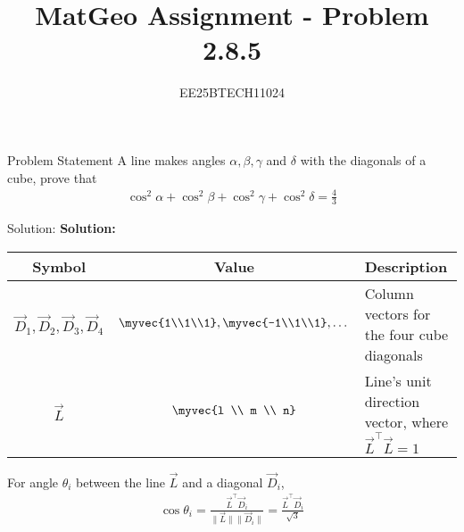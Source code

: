 \documentclass{beamer}
\title{MatGeo Assignment - Problem 2.8.5}
\author{EE25BTECH11024}
\institute{IIT Hyderabad}
\begin{document}
\begin{frame}
  \titlepage
\end{frame}

\begin{frame}{Problem Statement}
A line makes angles $\alpha, \beta, \gamma$ and $\delta$ with the diagonals of a cube, prove that
\begin{align}
\cos^2\alpha + \cos^2\beta + \cos^2\gamma + \cos^2\delta = \frac{4}{3}
\end{align}
\end{frame}

\begin{frame}{Solution: }
\noindent
\textbf{Solution:}\\

\begin{center}
    \begin{tabular}{|c|c|p{5cm}|}
    \hline
    \textbf{Symbol} & \textbf{Value} & \textbf{Description}  \\
    \hline
    \textbf{$\vec{D}_1, \vec{D}_2, \vec{D}_3, \vec{D}_4$} & $\myvec{1\\1\\1}, \myvec{-1\\1\\1}, \dots$ & Column vectors for the four cube diagonals \\
    \hline
    \textbf{$\vec{L}$} & $\myvec{l \\ m \\ n}$ & Line's unit direction vector, where $\vec{L}^\top\vec{L} = 1$ \\
    \hline
    \end{tabular}
\end{center}
\noindent

\noindent
For angle $\theta_i$ between the line $\vec{L}$ and a diagonal $\vec{D}_i$,
\begin{align}
    \cos\theta_i = \frac{\vec{L}^\top \vec{D}_i}{\|\vec{L}\| \|\vec{D}_i\|} = \frac{\vec{L}^\top \vec{D}_i}{\sqrt{3}}
    \label{eq:2.8.5.1}
\end{align}

\end{frame}
\end{document}

